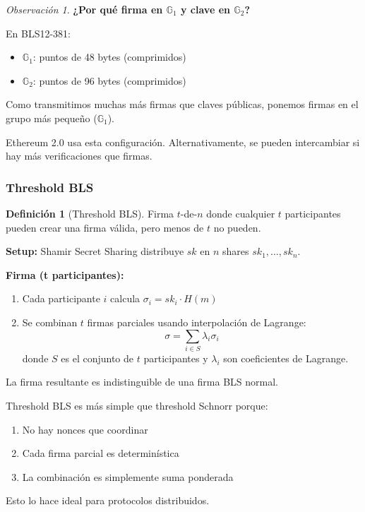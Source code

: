 \documentclass[11pt,a4paper,twoside,openright]{book}
\theoremstyle{definition}
\newtheorem{definition}{Definición}[chapter]
\theoremstyle{plain}
\theoremstyle{remark}
\newtheorem{remark}{Observación}[chapter]
\newcommand{\G}{\mathbb{G}}
\begin{document}
\begin{remark}
\textbf{¿Por qué firma en $\G_1$ y clave en $\G_2$?}

En BLS12-381:
\begin{itemize}
    \item $\G_1$: puntos de 48 bytes (comprimidos)
    \item $\G_2$: puntos de 96 bytes (comprimidos)
\end{itemize}

Como transmitimos muchas más firmas que claves públicas, ponemos firmas en el grupo más pequeño ($\G_1$).

Ethereum 2.0 usa esta configuración. Alternativamente, se pueden intercambiar si hay más verificaciones que firmas.
\end{remark}

\subsubsection{Threshold BLS}

\begin{definition}[Threshold BLS]
Firma $t$-de-$n$ donde cualquier $t$ participantes pueden crear una firma válida, pero menos de $t$ no pueden.

\textbf{Setup:} Shamir Secret Sharing distribuye $sk$ en $n$ shares $sk_1, \ldots, sk_n$.

\textbf{Firma (t participantes):}
\begin{enumerate}
    \item Cada participante $i$ calcula $\sigma_i = sk_i \cdot H(m)$
    \item Se combinan $t$ firmas parciales usando interpolación de Lagrange:
    \[ \sigma = \sum_{i \in S} \lambda_i \sigma_i \]
    donde $S$ es el conjunto de $t$ participantes y $\lambda_i$ son coeficientes de Lagrange.
\end{enumerate}

La firma resultante es indistinguible de una firma BLS normal.
\end{definition}

\begin{intuicion}
Threshold BLS es más simple que threshold Schnorr porque:
\begin{enumerate}
    \item No hay nonces que coordinar
    \item Cada firma parcial es determinística
    \item La combinación es simplemente suma ponderada
\end{enumerate}

Esto lo hace ideal para protocolos distribuidos.
\end{intuicion}
\end{document}
